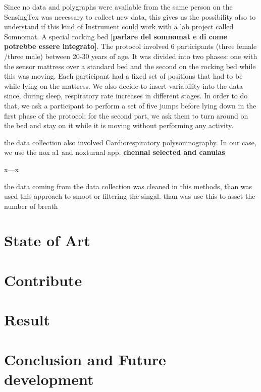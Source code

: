  Since no data and polygraphs were available from the same person
 on the SensingTex was necessary to collect new data, this gives 
 us the possibility also to understand if this kind of Instrument
  could work with a lab project called Somnomat. A special 
  rocking bed \textbf{[parlare del somnomat e di come potrebbe essere integrato]}. The protocol involved 6 participants (three female /three male) between 20-30 years of age. It was divided into two phases: one with the sensor mattress over a standard bed and the second on the rocking bed while this was moving. Each participant had a fixed set of positions that had to be while lying on the mattress. We also decide to insert variability into the data since, during sleep, respiratory rate increases in different stages. In order to do that, we ask a participant to perform a set of five jumps before lying down in the first phase of the protocol; for the second part, we ask them to turn around on the bed and stay on it 
  while it is moving without performing any activity.


  the data collection also involved Cardiorespiratory polysomnography. In our case, we use the nox a1 and noxturnal app. 
  \textbf{chennal selected and canulas}

  x---x

  the data coming from the data collection was cleaned in this methods, than was used this approach to smoot or filtering the singal.
  than was use this to asset the number of breath


\section{State of Art}
\section{Contribute}
\section{Result}
\section{Conclusion and Future development}
